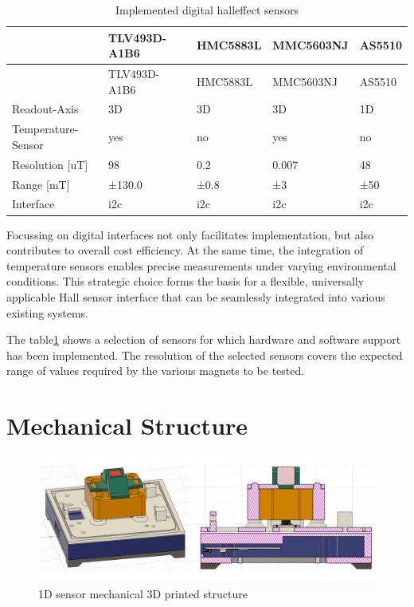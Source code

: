 \begin{longtable}[]{@{}lllll@{}}
\caption{Implemented digital halleffect sensors
\label{Implemented_digital_halleffect_sensors.csv}}\tabularnewline
\toprule
& TLV493D-A1B6 & HMC5883L & MMC5603NJ & AS5510\tabularnewline
\midrule
\endfirsthead
\toprule
& TLV493D-A1B6 & HMC5883L & MMC5603NJ & AS5510\tabularnewline
\midrule
\endhead
Readout-Axis & 3D & 3D & 3D & 1D\tabularnewline
Temperature-Sensor & yes & no & yes & no\tabularnewline
Resolution {[}uT{]} & 98 & 0.2 & 0.007 & 48\tabularnewline
Range {[}mT{]} & ±130.0 & ±0.8 & ±3 & ±50\tabularnewline
Interface & \gls{i2c} & \gls{i2c} & \gls{i2c} & \gls{i2c}\tabularnewline
\bottomrule
\end{longtable}

Focussing on digital interfaces not only facilitates implementation, but
also contributes to overall cost efficiency. At the same time, the
integration of temperature sensors enables precise measurements under
varying environmental conditions. This strategic choice forms the basis
for a flexible, universally applicable Hall sensor interface that can be
seamlessly integrated into various existing systems.

The table\ref{Implemented_digital_halleffect_sensors.csv} shows a
selection of sensors for which hardware and software support has been
implemented. The resolution of the selected sensors covers the expected
range of values required by the various magnets to be tested.

\hypertarget{mechanical-structure}{%
\section{Mechanical Structure}\label{mechanical-structure}}

\begin{figure}
\centering
\includegraphics{./generated_images/border_1D_sensor_mechanical_3D_printed_structure.png}
\caption{1D sensor mechanical 3D printed structure
\label{1D_sensor_mechanical_3D_printed_structure.png}}
\end{figure}

